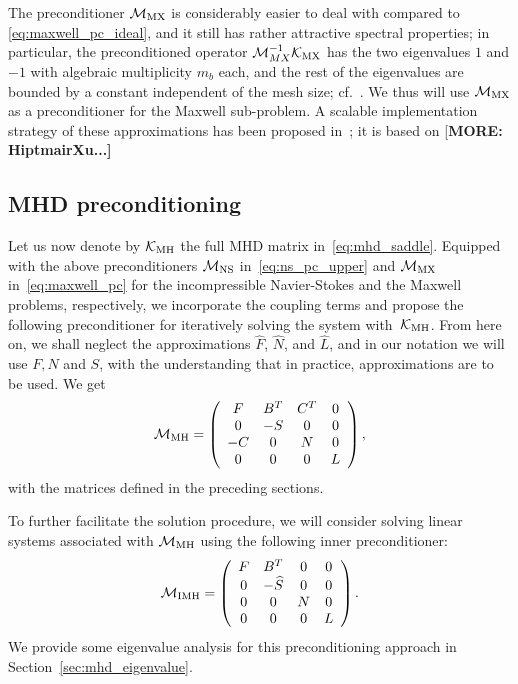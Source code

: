 \documentclass{siamltex}
\begin{document}
The preconditioner $\mathcal{M}_{\rm MX}$ is considerably easier to deal with compared to  \eqref{eq:maxwell_pc_ideal}, and it still has rather attractive spectral properties; in particular, the preconditioned operator $\mathcal{M}_{MX}^{-1} \mathcal{K}_{\rm MX}$ has the two eigenvalues $1$ and $-1$ with algebraic multiplicity $m_b$  each, and the rest of the eigenvalues are bounded by a constant independent of the mesh size; cf.~\cite{Greif07}. We thus will use $\mathcal{M}_{\rm MX}$ as a preconditioner for the Maxwell sub-problem.  A scalable implementation strategy of these approximations has been proposed in~\cite{LiGreifSchoetzauNLA}; it is based on {[\bf MORE: HiptmairXu...]}

\subsection{MHD preconditioning}

Let us now denote by ${\mathcal K}_{\rm MH}$ the full MHD matrix in~\eqref{eq:mhd_saddle}.
Equipped with the above preconditioners ${\mathcal M}_{\rm NS}$
in~\eqref{eq:ns_pc_upper}
and ${\mathcal M}_{\rm MX}$ in~\eqref{eq:maxwell_pc} for the incompressible Navier-Stokes and the Maxwell problems, respectively,
we incorporate the coupling terms and propose the following preconditioner for
iteratively solving the system with~${\mathcal K}_{\rm MH}$.  From here on, we shall neglect the approximations $\widehat{F}$, $\widehat{N}$, and $\widehat{L}$, and in our notation we will use $F, N$ and $S$, with the understanding that in practice, approximations are to be used. We get
\begin{equation}
\label{eq:mhd_pc_ls}
\mathcal{M}_{\rm MH} =
\left(
\begin{array}{cccc}
F & B^T & C^T & 0\\
0 & -S & 0 & 0 \\
-C & 0 & N & 0\\
0 & 0 & 0 & L
\end{array}
\right),
\end{equation}
with the matrices defined in the preceding sections.


To further facilitate the solution procedure, we will consider
solving linear systems associated with $\mathcal{M}_{\rm MH}$ using the following inner preconditioner:
\begin{equation}
\label{eq:mhd_pc_inner}
\mathcal{M}_{\rm IMH} =
\left(
\begin{array}{cccc}
F & B^T & 0 & 0\\
0 & -\widehat{S} & 0 & 0 \\
0 & 0 & N & 0\\
0 & 0 & 0 & L
\end{array}
\right).
\end{equation}
We provide some  eigenvalue analysis for this preconditioning approach in Section~\ref{sec:mhd_eigenvalue}.
\end{document}
